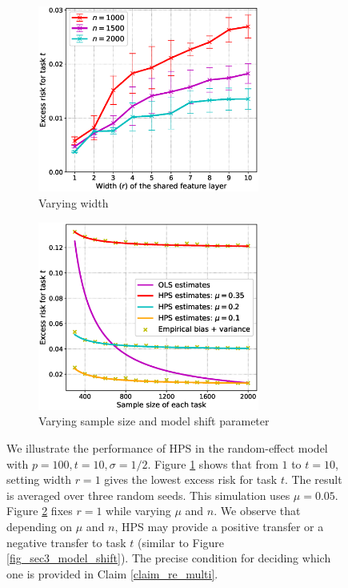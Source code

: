 \begin{figure}[!t]
	\begin{subfigure}[b]{0.5\textwidth}
		\centering
		\includegraphics[width=0.8\textwidth]{figures/multitask_width.eps}
		\caption{Varying width}
		\label{fig_sec4_width}
	\end{subfigure}
	\begin{subfigure}[b]{0.5\textwidth}
		\centering
		\includegraphics[width=0.8\textwidth]{figures/multitask_transfer.eps}
		\caption{Varying sample size and model shift parameter}
		\label{fig_sec4_transfer}
	\end{subfigure}
	\caption{We illustrate the performance of HPS in the random-effect model with $p = 100, t = 10, \sigma = 1/2$.
	Figure \ref{fig_sec4_width} shows that from $1$ to $t = 10$, setting width $r = 1$ gives the lowest excess risk for task $t$.
	The result is averaged over three random seeds.
	This simulation uses $\mu = 0.05$.
	Figure \ref{fig_sec4_transfer} fixes $r = 1$ while varying $\mu$ and $n$. We observe that depending on $\mu$ and $n$, HPS may provide a positive transfer or a negative transfer to task $t$ (similar to Figure \ref{fig_sec3_model_shift}). The precise condition for deciding which one is provided in Claim \ref{claim_re_multi}.}
	\label{fig_sec4}
\end{figure}


